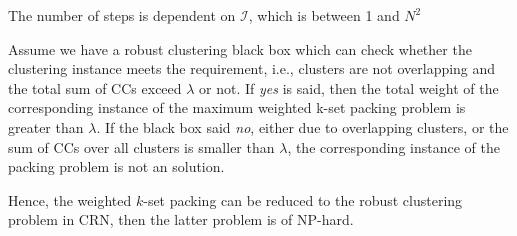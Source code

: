 \documentclass[10pt,journal,compsoc]{IEEEtran}
\makeatletter
\theoremstyle{mytheoremstyle}
\theoremstyle{mytheoremstyle}
\theoremstyle{mytheoremstyle}
\renewenvironment{proof}[1][\proofname]{%
      \par\pushQED{\qed}\fontfamily{ptm}\selectfont%
      \topsep6\p@\@plus6\p@\relax
      \trivlist\item[\hskip\labelsep\bfseries#1\@addpunct{.}]%
      \ignorespaces
    }{%
      \popQED\endtrivlist\@endpefalse
    }
\newcommand{\ie}{i.e., }
\makeatother
\begin{document}
\begin{proof}
\begin{itemize}

\end{itemize}
The number of steps is dependent on $\mathcal{I}$, which is between 1 and $N^2$

Assume we have a robust clustering black box which can check whether the clustering instance meets the requirement, \ie clusters are not overlapping and the total sum of CCs exceed $\lambda$ or not.
If \textit{yes} is said, then the total weight of the corresponding instance of the maximum weighted k-set packing problem is greater than $\lambda$.
If the black box said \textit{no}, either due to overlapping clusters, or the sum of CCs over all clusters is smaller than $\lambda$, the corresponding instance of the packing problem is not an solution.


Hence, the weighted $k$-set packing can be reduced to the robust clustering problem in CRN, then the latter problem is of NP-hard.




\end{proof}
\end{document}
